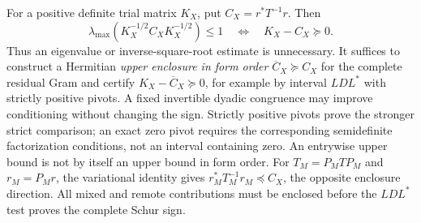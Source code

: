 \begin{remark}
\label{rem:v122-head-ldl}
For a positive definite trial matrix $K_X$, put
$C_X=r^*T^{-1}r$. Then
\[
 \lambda_{\max}(K_X^{-1/2}C_XK_X^{-1/2})\le1
 \quad\Longleftrightarrow\quad K_X-C_X\succeq0.
\]
Thus an eigenvalue or inverse-square-root estimate is unnecessary.
It suffices to construct a Hermitian \emph{upper enclosure in form
order} $\overline C_X\succeq C_X$ for the complete residual Gram
and certify $K_X-\overline C_X\succeq0$, for example by interval
$LDL^*$ with strictly positive pivots. A fixed invertible dyadic
congruence may improve conditioning without changing the sign.
Strictly positive pivots prove the stronger strict comparison;
an exact zero pivot requires the corresponding semidefinite
factorization conditions, not an interval containing zero.
An entrywise upper bound is not by itself an upper bound in form
order. For $T_M=P_MT P_M$ and $r_M=P_Mr$, the variational identity
gives $r_M^*T_M^{-1}r_M\preceq C_X$, the opposite enclosure
direction. All mixed and remote contributions must be enclosed
before the $LDL^*$ test proves the complete Schur sign.
\end{remark}
